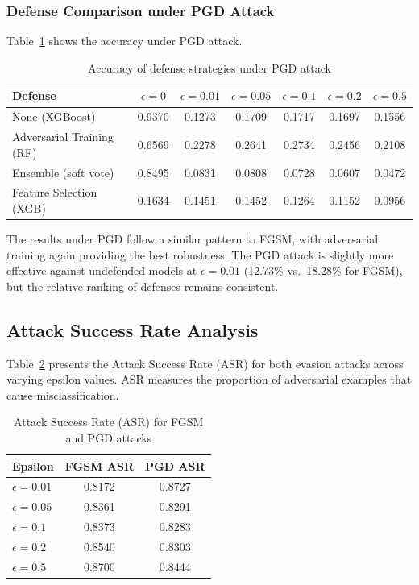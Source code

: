 \documentclass[12pt,a4paper,oneside]{report}
\begin{document}
\subsubsection{Defense Comparison under PGD Attack}

Table~\ref{tab:defense_pgd} shows the accuracy under PGD attack.

\begin{table}[H]
    \centering
    \caption[Defense comparison under PGD]{Accuracy of defense strategies under PGD attack}\label{tab:defense_pgd}
    \begin{tabular}{lcccccc}
        \toprule
        Defense & $\epsilon=0$ & $\epsilon=0.01$ & $\epsilon=0.05$ & $\epsilon=0.1$ & $\epsilon=0.2$ & $\epsilon=0.5$ \\
        \midrule
        None (XGBoost)            & 0.9370 & 0.1273 & 0.1709 & 0.1717 & 0.1697 & 0.1556 \\
        Adversarial Training (RF) & 0.6569 & 0.2278 & 0.2641 & 0.2734 & 0.2456 & 0.2108 \\
        Ensemble (soft vote)      & 0.8495 & 0.0831 & 0.0808 & 0.0728 & 0.0607 & 0.0472 \\
        Feature Selection (XGB)   & 0.1634 & 0.1451 & 0.1452 & 0.1264 & 0.1152 & 0.0956 \\
        \bottomrule
    \end{tabular}
\end{table}

The results under PGD follow a similar pattern to FGSM, with adversarial training again providing the best robustness. The PGD attack is slightly more effective against undefended models at $\epsilon = 0.01$ (12.73\% vs.~18.28\% for FGSM), but the relative ranking of defenses remains consistent.

\subsection{Attack Success Rate Analysis}

Table~\ref{tab:asr} presents the Attack Success Rate (ASR) for both evasion attacks across varying epsilon values. ASR measures the proportion of adversarial examples that cause misclassification.

\begin{table}[H]
    \centering
    \caption[Attack success rate (ASR)]{Attack Success Rate (ASR) for FGSM and PGD attacks}\label{tab:asr}
    \begin{tabular}{lcc}
        \toprule
        Epsilon & FGSM ASR & PGD ASR \\
        \midrule
        $\epsilon=0.01$ & 0.8172 & 0.8727 \\
        $\epsilon=0.05$ & 0.8361 & 0.8291 \\
        $\epsilon=0.1$  & 0.8373 & 0.8283 \\
        $\epsilon=0.2$  & 0.8540 & 0.8303 \\
        $\epsilon=0.5$  & 0.8700 & 0.8444 \\
        \bottomrule
    \end{tabular}
\end{table}
\end{document}
